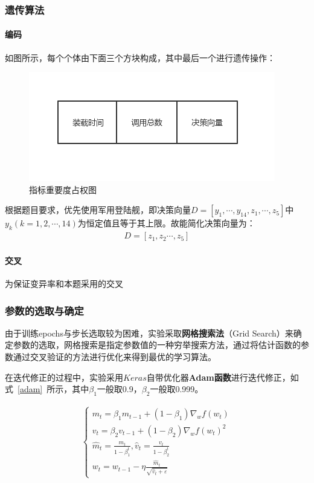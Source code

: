 \documentclass{whutmod}
\begin{document}
	\subsubsection{遗传算法}
	 \paragraph{编码}
	 如图所示，每个个体由下面三个方块构成，其中最后一个进行遗传操作：
	 	\begin{figure}[H]
	 	\centering
	 	\includegraphics[width=.7\textwidth]{figures/yichuan.png}
	 	\caption{指标重要度占权图}\label{yichuan}
	 	 \end{figure}
	 根据题目要求，优先使用军用登陆舰，即决策向量$D=[y_{1},\cdots,y_{14},z_{1},\cdots,z_{5}]$中$y_{k}(k=1,2,\cdots,14)$为恒定值且等于其上限。故能简化决策向量为：
	\begin{gather*}
	D=[z_{1},z_{2}\cdots,z_{5}]
	\end{gather*}
	 \paragraph{交叉}
	 为保证变异率和本题采用的交叉

	\subsubsection{参数的选取与确定}
	由于训练epochs与步长选取较为困难，实验采取\textbf{网格搜索法}（Grid Search）来确定参数的选取，网格搜索是指定参数值的一种穷举搜索方法，通过将估计函数的参数通过交叉验证的方法进行优化来得到最优的学习算法。
	
	在迭代修正的过程中，实验采用$Keras$自带优化器\textbf{Adam函数}进行迭代修正，如式~\ref{adam}~所示，其中$\beta_{1}$一般取0.9，$\beta_{2}$一般取0.999。
	
	\begin{gather*}\label{adam}
	\left\{\begin{array}{l}{m_{t}=\beta_{1} m_{t-1}+\left(1-\beta_{1}\right) \nabla_{w} f\left(w_{t}\right)} \\ {v_{t}=\beta_{2} v_{t-1}+\left(1-\beta_{2}\right) \nabla_{w} f\left(w_{t}\right)^{2}} \\ {\widehat{m}_{t}=\frac{m_{t}}{1-\beta_{1}^{t}}, \hat{v}_{t}=\frac{v_{t}}{1-\beta_{2}^{t}}} \\ {w_{t}=w_{t-1}-\eta \frac{\widehat{m}_{t}}{\sqrt{\hat{v}_{t}+\varepsilon}}}\end{array}\right.
	\end{gather*}
\end{document}
